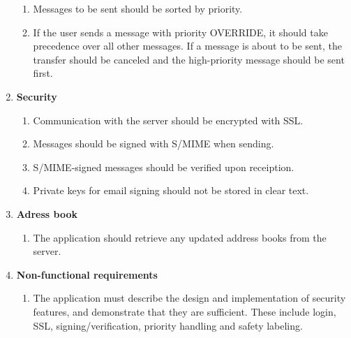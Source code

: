 \begin{enumerate}
\begin{enumerate}
\item{}Messages to be sent should be sorted by priority.
\item{}If the user sends a message with priority OVERRIDE, it should take precedence over all other messages. If a message is about to be sent, the transfer should be canceled and the high-priority message should be sent first.
\end{enumerate}
\item{}\textbf{Security}
\begin{enumerate}
\item{}Communication with the server should be encrypted with SSL.
\item{}Messages should be signed with S/MIME when sending.
\item{}S/MIME-signed messages should be verified upon receiption.
\item{}Private keys for email signing should not be stored in clear text.
\end{enumerate}

\newpage

\item{}\textbf{Adress book}
\begin{enumerate}
\item{}The application should retrieve any updated address books from the server.
\end{enumerate}
\item{}\textbf{Non-functional requirements}
\begin{enumerate}
\item{}The application must describe the design and implementation of security features, and demonstrate that they are sufficient. These include login, SSL, signing/verification, priority handling and safety labeling.
\end{enumerate}
\end{enumerate}